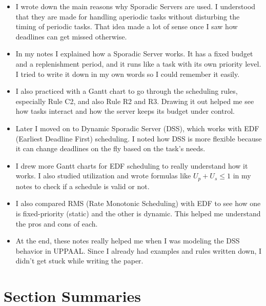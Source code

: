 \documentclass[conference]{IEEEtran}
\begin{document}
\begin{itemize}
 \item I wrote down the main reasons why Sporadic Servers are used. I understood that they are made for handling aperiodic tasks without disturbing the timing of periodic tasks. That idea made a lot of sense once I saw how deadlines can get missed otherwise.

\item In my notes I explained how a Sporadic Server works. It has a fixed budget and a replenishment period, and it runs like a task with its own priority level. I tried to write it down in my own words so I could remember it easily.

\item I also practiced with a Gantt chart to go through the scheduling rules, especially Rule C2, and also Rule R2 and R3. Drawing it out helped me see how tasks interact and how the server keeps its budget under control.

\item Later I moved on to Dynamic Sporadic Server (DSS), which works with EDF (Earliest Deadline First) scheduling. I noted how DSS is more flexible because it can change deadlines on the fly based on the task's needs.

\item I drew more Gantt charts for EDF scheduling to really understand how it works. I also studied utilization and wrote formulas like \( U_p + U_s \leq 1 \) in my notes to check if a schedule is valid or not.

\item I also compared RMS (Rate Monotonic Scheduling) with EDF to see how one is fixed-priority (static) and the other is dynamic. This helped me understand the pros and cons of each.

\item At the end, these notes really helped me when I was modeling the DSS behavior in UPPAAL. Since I already had examples and rules written down, I didn’t get stuck while writing the paper.


\end{itemize}

\section*{Section Summaries}
\end{document}
